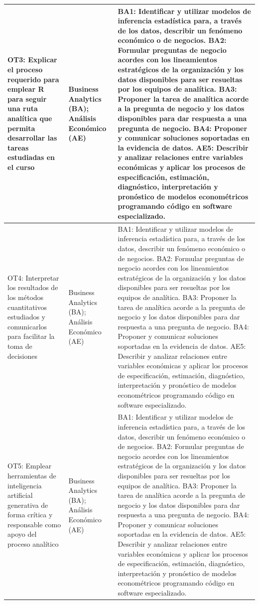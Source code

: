 \documentclass[11pt,a4paper]{article}
\begin{document}
\begin{longtable}{|p{5cm}|p{4cm}|p{6cm}|}
OT3: Explicar el proceso requerido para emplear R para seguir una ruta analítica que permita desarrollar las tareas estudiadas en el curso &
Business Analytics (BA); Análisis Económico (AE) &
BA1: Identificar y utilizar modelos de inferencia estadística para, a través de los datos, describir un fenómeno económico o de negocios.
BA2: Formular preguntas de negocio acordes con los lineamientos estratégicos de la organización y los datos disponibles para ser resueltas por los equipos de analítica.
BA3: Proponer la tarea de analítica acorde a la pregunta de negocio y los datos disponibles para dar respuesta a una pregunta de negocio.
BA4: Proponer y comunicar soluciones soportadas en la evidencia de datos.
AE5: Describir y analizar relaciones entre variables económicas y aplicar los procesos de especificación, estimación, diagnóstico, interpretación y pronóstico de modelos econométricos programando código en software especializado. \\
\hline

OT4: Interpretar los resultados de los métodos cuantitativos estudiados y comunicarlos para facilitar la toma de decisiones &
Business Analytics (BA); Análisis Económico (AE) &
BA1: Identificar y utilizar modelos de inferencia estadística para, a través de los datos, describir un fenómeno económico o de negocios.
BA2: Formular preguntas de negocio acordes con los lineamientos estratégicos de la organización y los datos disponibles para ser resueltas por los equipos de analítica.
BA3: Proponer la tarea de analítica acorde a la pregunta de negocio y los datos disponibles para dar respuesta a una pregunta de negocio.
BA4: Proponer y comunicar soluciones soportadas en la evidencia de datos.
AE5: Describir y analizar relaciones entre variables económicas y aplicar los procesos de especificación, estimación, diagnóstico, interpretación y pronóstico de modelos econométricos programando código en software especializado. \\
\hline

OT5: Emplear herramientas de inteligencia artificial generativa de forma crítica y responsable como apoyo del proceso analítico &
Business Analytics (BA); Análisis Económico (AE) &
BA1: Identificar y utilizar modelos de inferencia estadística para, a través de los datos, describir un fenómeno económico o de negocios.
BA2: Formular preguntas de negocio acordes con los lineamientos estratégicos de la organización y los datos disponibles para ser resueltas por los equipos de analítica.
BA3: Proponer la tarea de analítica acorde a la pregunta de negocio y los datos disponibles para dar respuesta a una pregunta de negocio.
BA4: Proponer y comunicar soluciones soportadas en la evidencia de datos.
AE5: Describir y analizar relaciones entre variables económicas y aplicar los procesos de especificación, estimación, diagnóstico, interpretación y pronóstico de modelos econométricos programando código en software especializado. \\
\hline

\end{longtable}
\end{document}
